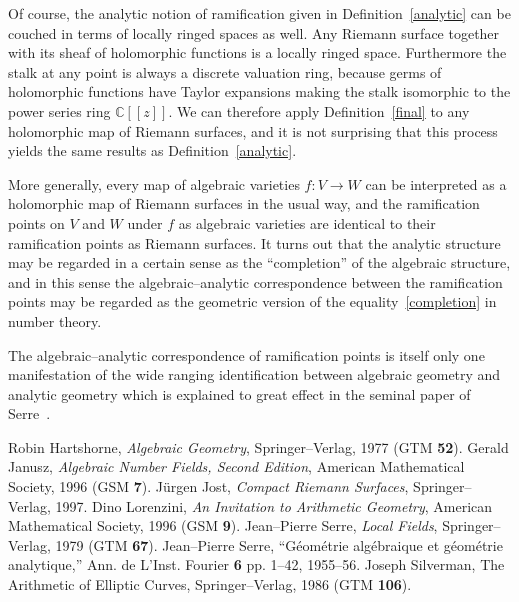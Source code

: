 \documentclass[12pt]{article}
\newcommand{\C}{\mathbb{C}}
\newcommand{\lra}{\longrightarrow}
\theoremstyle{definition}
\begin{document}
Of course, the analytic notion of ramification given in
Definition~\ref{analytic} can be couched in terms of locally ringed
spaces as well. Any Riemann surface together with its sheaf of
holomorphic functions is a locally ringed space. Furthermore the stalk
at any point is always a discrete valuation ring, because germs of
holomorphic functions have Taylor expansions making the stalk
isomorphic to the power series ring $\C[[z]]$. We can therefore apply
Definition~\ref{final} to any holomorphic map of Riemann surfaces, and
it is not surprising that this process yields the same results as
Definition~\ref{analytic}.

More generally, every map of algebraic varieties $f: V \lra W$ can be
interpreted as a holomorphic map of Riemann surfaces in the usual way,
and the ramification points on $V$ and $W$ under $f$ as algebraic
varieties are identical to their ramification points as Riemann
surfaces. It turns out that the analytic structure may be regarded in
a certain sense as the ``completion'' of the algebraic structure, and in
this sense the algebraic--analytic correspondence between the
ramification points may be regarded as the geometric version of the
equality~\eqref{completion} in number theory.

The algebraic--analytic correspondence of ramification points is
itself only one manifestation of the wide ranging identification
between algebraic geometry and analytic geometry which is explained to
great effect in the seminal paper of Serre~\cite{gaga}.

\begin{thebibliography}{9}
 Robin Hartshorne, {\em Algebraic
Geometry}, Springer--Verlag, 1977 (GTM {\bf 52}).
 Gerald Janusz, {\em Algebraic Number Fields, Second
Edition}, American Mathematical Society, 1996 (GSM {\bf 7}).
 J\"urgen Jost, {\em Compact Riemann Surfaces},
Springer--Verlag, 1997.
 Dino Lorenzini, {\em An Invitation to Arithmetic Geometry}, American Mathematical Society, 1996 (GSM {\bf 9}).
 Jean--Pierre Serre, {\em Local Fields},
Springer--Verlag, 1979 (GTM {\bf 67}).
 Jean--Pierre Serre, ``G\'eom\'etrie alg\'ebraique et
g\'eom\'etrie analytique,'' Ann. de L'Inst. Fourier {\bf 6} pp. 1--42,
1955--56.
 Joseph Silverman, {The Arithmetic of Elliptic
Curves}, Springer--Verlag, 1986 (GTM {\bf 106}).
\end{thebibliography}
\end{document}
